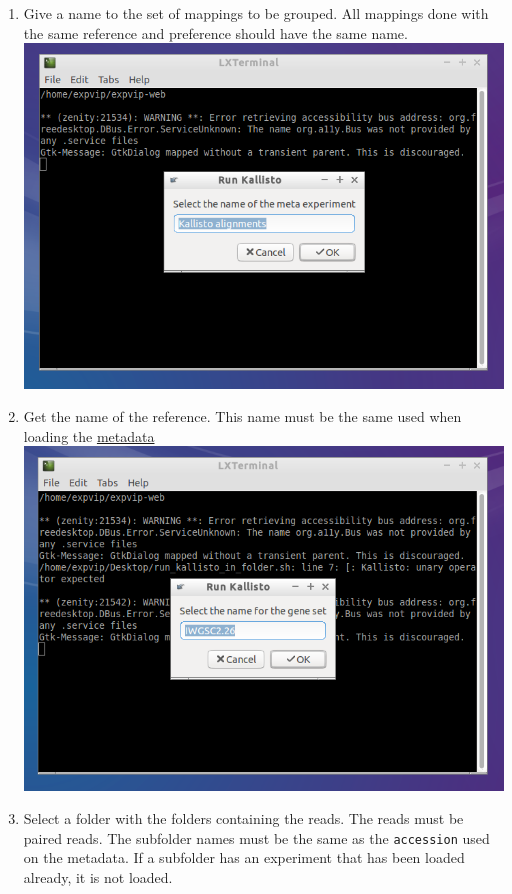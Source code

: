\begin{enumerate}
\item
  Give a name to the set of mappings to be grouped. All mappings done
  with the same reference and preference should have the same name.
  \includegraphics{images/KallistoBatch03.png}
\item
  Get the name of the reference. This name must be the same used when
  loading the \href{LoadingMetadata}{metadata}
  \includegraphics{images/KallistoBatch04.png}
\item
  Select a folder with the folders containing the reads. The reads must
  be paired reads. The subfolder names must be the same as the
  \lstinline!accession! used on the metadata. If a subfolder has an
  experiment that has been loaded already, it is not loaded.

\end{enumerate}

